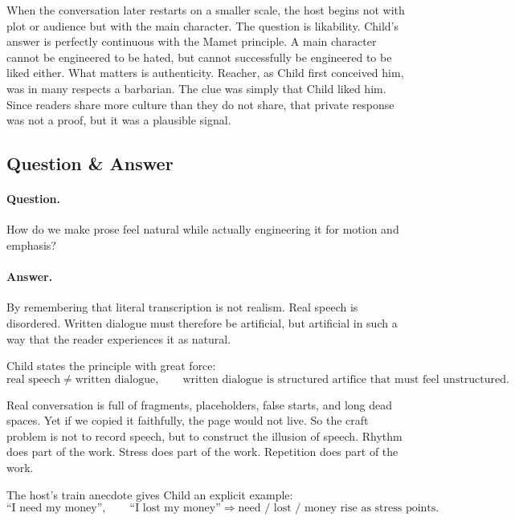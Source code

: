 When the conversation later restarts on a smaller scale, the host begins not with plot or audience but with the main character. The question is likability. Child's answer is perfectly continuous with the Mamet principle. A main character cannot be engineered to be hated, but cannot successfully be engineered to be liked either. What matters is authenticity. Reacher, as Child first conceived him, was in many respects a barbarian. The clue was simply that Child liked him. Since readers share more culture than they do not share, that private response was not a proof, but it was a plausible signal.

\subsection{Question \& Answer}

\paragraph{Question.} How do we make prose feel natural while actually engineering it for motion and emphasis?

\paragraph{Answer.} By remembering that literal transcription is not realism. Real speech is disordered. Written dialogue must therefore be artificial, but artificial in such a way that the reader experiences it as natural.

Child states the principle with great force:
\begin{equation}
\text{real speech} \neq \text{written dialogue},
\qquad
\text{written dialogue is structured artifice that must feel unstructured}.
\end{equation}

Real conversation is full of fragments, placeholders, false starts, and long dead spaces. Yet if we copied it faithfully, the page would not live. So the craft problem is not to record speech, but to construct the illusion of speech. Rhythm does part of the work. Stress does part of the work. Repetition does part of the work.

The host's train anecdote gives Child an explicit example:
\begin{equation}
\text{``I need my money''}, \qquad \text{``I lost my money''}
\Longrightarrow
\text{need / lost / money rise as stress points.}
\end{equation}

